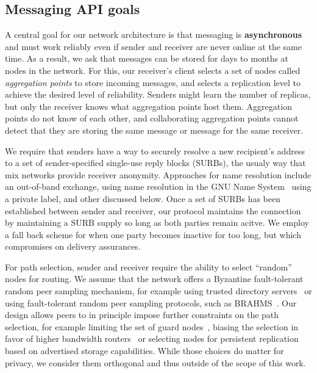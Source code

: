 \subsection{Messaging API goals} 

A central goal for our network architecture is that messaging is 
{\bf asynchronous} and must work reliably even if sender and receiver
are never online at the same time.  As a result, we ask that messages
can be stored for days to months at nodes in the network.  For this,
our receiver's client selects a set of nodes called {\em aggregation
points} to store incoming messages, and selects a replication level
to achieve the desired level of reliability.  Senders might learn the
number of replicas, but only the receiver knows what aggregation
points host them.  Aggregation points do not know of each other, and
collaborating aggregation points cannot detect that they are storing
the same message or message for the same receiver.

We require that senders have a way to securely resolve a new
recipient's address to a set of sender-specified single-use reply
blocks (SURBs), the usualy way that mix networks provide receiver
anonymity.  Approaches for name resolution include an out-of-band
exchange, using name resolution in the GNU Name System~\cite{gns}
using a private label, and other discussed below.  Once a set of
SURBs has been established between sender and receiver, our protocol
maintains the connection by maintaining a SURB supply so long as
both parties remain acitve.  We employ a fall back scheme for when
one party becomes inactive for too long, but which compromises on
delivery assurances.  %

For path selection, sender and receiver require the ability to select
``random'' nodes for routing.  We assume that the network offers a
Byzantine fault-tolerant random peer sampling mechanism, for example
using trusted directory servers~\cite{tordir} or using fault-tolerant
random peer sampling protocols, such as BRAHMS~\cite{brahms}.  Our
design allows peers to in principle impose further constraints on the
path selection, for example limiting the set of guard
nodes~\cite{oneguardisenough}, biasing the selection in favor of
higher bandwidth routers~\cite{findexample} or selecting nodes for
persistent replication based on advertised storage capabilities.
While those choices do matter for privacy, we consider them orthogonal
and thus outside of the scope of this work.

